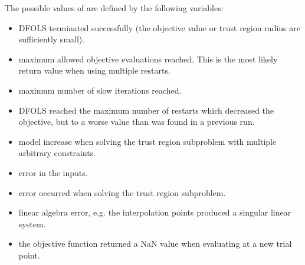\documentclass[letterpaper,10pt,english]{sphinxmanual}
\begin{document}
\sphinxAtStartPar
The possible values of  are defined by the following variables:
\begin{itemize}
\item {} 
\sphinxAtStartPar
{} \sphinxhyphen{} DFO\sphinxhyphen{}LS terminated successfully (the objective value or trust region radius are sufficiently small).

\item {} 
\sphinxAtStartPar
{} \sphinxhyphen{} maximum allowed objective evaluations reached. This is the most likely return value when using multiple restarts.

\item {} 
\sphinxAtStartPar
{} \sphinxhyphen{} maximum number of slow iterations reached.

\item {} 
\sphinxAtStartPar
{} \sphinxhyphen{} DFO\sphinxhyphen{}LS reached the maximum number of restarts which decreased the objective, but to a worse value than was found in a previous run.

\item {} 
\sphinxAtStartPar
{} \sphinxhyphen{} model increase when solving the trust region subproblem with multiple arbitrary constraints.

\item {} 
\sphinxAtStartPar
{} \sphinxhyphen{} error in the inputs.

\item {} 
\sphinxAtStartPar
{} \sphinxhyphen{} error occurred when solving the trust region subproblem.

\item {} 
\sphinxAtStartPar
{} \sphinxhyphen{} linear algebra error, e.g. the interpolation points produced a singular linear system.

\item {} 
\sphinxAtStartPar
{} \sphinxhyphen{} the objective function returned a NaN value when evaluating at a new trial point.

\end{itemize}
\end{document}
